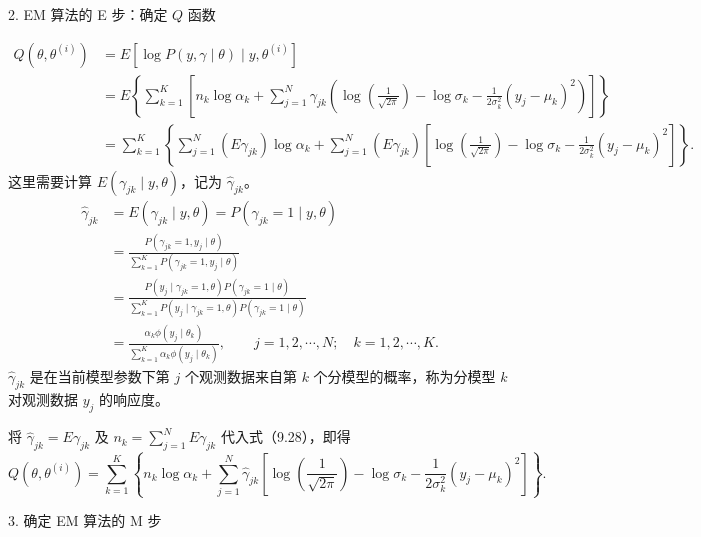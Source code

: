\documentclass[UTF8,12pt,a4paper,fontset=fandol]{ctexart}
\begin{document}
2. EM 算法的 E 步：确定 $Q$ 函数

\begin{equation}
\begin{aligned}
  Q(\theta,\theta^{(i)})
  &=E[\log P(y,\gamma\mid\theta)\mid y,\theta^{(i)}]\\
  &=E\left\{\sum_{k=1}^K\left[
  n_k\log\alpha_k+\sum_{j=1}^N\gamma_{jk}
  \left(\log\left(\frac1{\sqrt{2\pi}}\right)-\log\sigma_k
  -\frac1{2\sigma_k^2}(y_j-\mu_k)^2\right)\right]\right\}\\
  &=\sum_{k=1}^K\left\{
  \sum_{j=1}^N(E\gamma_{jk})\log\alpha_k+
  \sum_{j=1}^N(E\gamma_{jk})
  \left[\log\left(\frac1{\sqrt{2\pi}}\right)-\log\sigma_k
  -\frac1{2\sigma_k^2}(y_j-\mu_k)^2\right]\right\}.
\end{aligned}
  \tag{9.28}
\end{equation}
这里需要计算 $E(\gamma_{jk}\mid y,\theta)$，记为 $\hat{\gamma}_{jk}$。
\[
\begin{aligned}
  \hat{\gamma}_{jk}
  &=E(\gamma_{jk}\mid y,\theta)=P(\gamma_{jk}=1\mid y,\theta)\\
  &=\frac{P(\gamma_{jk}=1,y_j\mid\theta)}
  {\sum_{k=1}^K P(\gamma_{jk}=1,y_j\mid\theta)}\\
  &=\frac{P(y_j\mid\gamma_{jk}=1,\theta)P(\gamma_{jk}=1\mid\theta)}
  {\sum_{k=1}^K P(y_j\mid\gamma_{jk}=1,\theta)P(\gamma_{jk}=1\mid\theta)}\\
  &=\frac{\alpha_k\phi(y_j\mid\theta_k)}
  {\sum_{k=1}^K\alpha_k\phi(y_j\mid\theta_k)},
  \qquad j=1,2,\cdots,N;\quad k=1,2,\cdots,K.
\end{aligned}
\]
$\hat{\gamma}_{jk}$ 是在当前模型参数下第 $j$ 个观测数据来自第 $k$ 个分模型的概率，称为分模型 $k$ 对观测数据 $y_j$ 的响应度。

将 $\hat{\gamma}_{jk}=E\gamma_{jk}$ 及 $n_k=\sum_{j=1}^N E\gamma_{jk}$ 代入式（9.28），即得
\begin{equation}
  Q(\theta,\theta^{(i)})
  =\sum_{k=1}^K\left\{
  n_k\log\alpha_k+\sum_{j=1}^N\hat{\gamma}_{jk}
  \left[\log\left(\frac1{\sqrt{2\pi}}\right)-\log\sigma_k
  -\frac1{2\sigma_k^2}(y_j-\mu_k)^2\right]\right\}.
  \tag{9.29}
\end{equation}

3. 确定 EM 算法的 M 步
\end{document}

